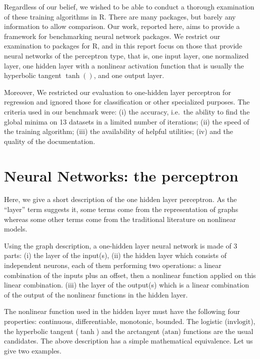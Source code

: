 Regardless of our belief, we wished to be able to conduct a thorough
examination of these training algorithms in \textsf{R}. There are many
packages, but barely any information to allow comparison. Our work,
reported here, aims to provide a framework for benchmarking neural
network packages. We restrict our examination to packages for R, and in
this report focus on those that provide neural networks of the
perceptron type, that is, one input layer, one normalized layer, one
hidden layer with a nonlinear activation function that is usually the
hyperbolic tangent \(\tanh()\), and one output layer.

Moreover, We restricted our evaluation to one-hidden layer perceptron
for regression and ignored those for classification or other specialized
purposes. The criteria used in our benchmark were: (i) the accuracy,
i.e.~the ability to find the global minima on 13 datasets in a limited
number of iterations; (ii) the speed of the training algorithm; (iii)
the availability of helpful utilities; (iv) and the quality of the
documentation.

\hypertarget{neural-networks-the-perceptron}{%
\section{Neural Networks: the
perceptron}\label{neural-networks-the-perceptron}}

Here, we give a short description of the one hidden layer perceptron. As
the ``layer'' term suggests it, some terms come from the representation
of graphs whereas some other terms come from the traditional literature
on nonlinear models.

Using the graph description, a one-hidden layer neural network is made
of 3 parts: (i) the layer of the input(s), (ii) the hidden layer which
consists of independent neurons, each of them performing two operations:
a linear combination of the inputs plus an offset, then a nonlinear
function applied on this linear combination. (iii) the layer of the
output(s) which is a linear combination of the output of the nonlinear
functions in the hidden layer.

The nonlinear function used in the hidden layer must have the following
four properties: continuous, differentiable, monotonic, bounded. The
logistic (\(\text{invlogit}\)), the hyperbolic tangent (\(\tanh\)) and
the arctangent (\(\text{atan}\)) functions are the usual candidates. The
above description has a simple mathematical equivalence. Let us give two
examples.

